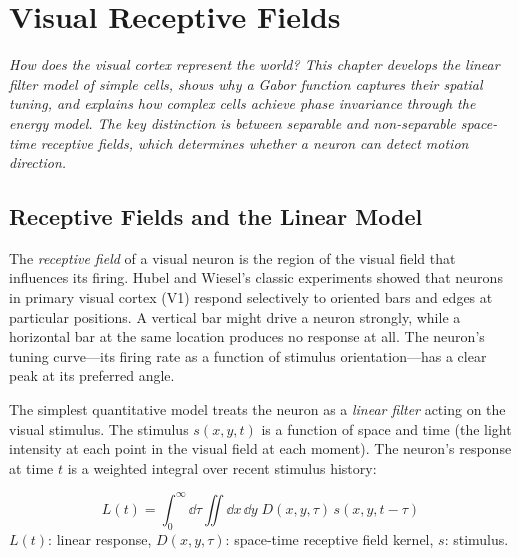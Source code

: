 \chapter{Visual Receptive Fields}
\label{ch:receptive-fields}

\textit{How does the visual cortex represent the world? This chapter develops the linear filter model of simple cells, shows why a Gabor function captures their spatial tuning, and explains how complex cells achieve phase invariance through the energy model. The key distinction is between separable and non-separable space-time receptive fields, which determines whether a neuron can detect motion direction.}

\section{Receptive Fields and the Linear Model}
\label{sec:receptive-field}

The \emph{receptive field} of a visual neuron is the region of the visual field that influences its firing. Hubel and Wiesel's classic experiments showed that neurons in primary visual cortex (V1) respond selectively to oriented bars and edges at particular positions. A vertical bar might drive a neuron strongly, while a horizontal bar at the same location produces no response at all. The neuron's tuning curve---its firing rate as a function of stimulus orientation---has a clear peak at its preferred angle.

The simplest quantitative model treats the neuron as a \emph{linear filter} acting on the visual stimulus. The stimulus $s(x, y, t)$ is a function of space and time (the light intensity at each point in the visual field at each moment). The neuron's response at time $t$ is a weighted integral over recent stimulus history:

\begin{keyequation}
\begin{equation}
  L(t) = \int_0^\infty \!\dd\tau \iint \dd x\,\dd y\; D(x, y, \tau)\, s(x, y, t - \tau)
  \label{eq:linear-rf}
\end{equation}
\tcblower
$L(t)$: linear response, \quad
$D(x, y, \tau)$: space-time receptive field kernel, \quad
$s$: stimulus.
\end{keyequation}

